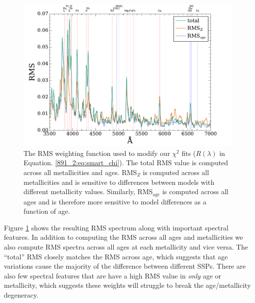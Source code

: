 
\begin{figure}
  \centering
  \includegraphics[width=\columnwidth]{891_2/figs/RMS_spec.pdf}
  \caption[RMS-based $\chi^2$ fitting
    weights]{\fixspacing\label{891_2:fig:RMS_spec}The RMS weighting
    function used to modify our $\chi^2$ fits ($R(\lambda)$ in
    Equation. \ref{891_2:eq:smart_chi}). The total RMS value is
    computed across all metallicities and ages. RMS$_Z$ is computed
    across all metallicities and is sensitive to differences between
    models with different metallicity values. Similarly,
    RMS$_\mathrm{age}$ is computed across all ages and is therefore
    more sensitive to model differences as a function of age.}
\end{figure}

Figure \ref{891_2:fig:RMS_spec} shows the resulting RMS spectrum along
with important spectral features. In addition to computing the RMS
across all ages and metallicities we also compute RMS spectra across
all ages at each metallicity and vice versa. The ``total'' RMS closely
matches the RMS across age, which suggests that age variations cause
the majority of the difference between different SSPs. There are also
few spectral features that are have a high RMS value in \emph{only}
age or metallicity, which suggests these weights will struggle to
break the age/metallicity degeneracy.

